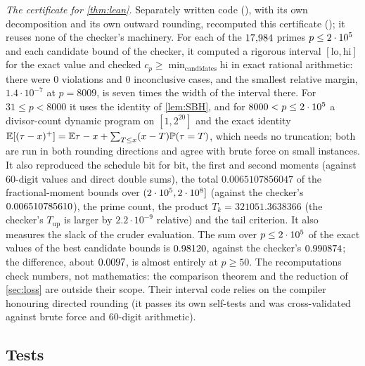 \emph{The certificate for \cref{thm:lean}.} Separately written code (), with its own
decomposition and its own outward rounding, recomputed this certificate (); it reuses none
of the checker's machinery. For each of the $17{,}984$ primes $p\le2\cdot 10^{5}$ and each candidate bound of the checker, it
computed a rigorous interval $[\mathrm{lo},\mathrm{hi}]$ for the exact value and checked
$c_p\ge\min_{\text{candidates}}\mathrm{hi}$ in exact rational arithmetic: there were $0$ violations and $0$
inconclusive cases, and the smallest relative margin, $1.4\cdot10^{-7}$ at $p=8009$, is seven times the width of the
interval there. For $31\le p<8000$ it uses the identity of \cref{lem:SBH}, and for $8000<p\le2\cdot 10^{5}$ a divisor-count
dynamic program on $[1,2^{20}]$ and the exact identity $\mathbb{E}[(\tau-x)^+]=\mathbb{E}\tau-x+\sum_{T\le x}(x-T)\mathbb{P}(\tau=T)$, which
needs no truncation; both are run in both rounding directions and agree with brute force on small instances. It also
reproduced the schedule bit for bit, the first and second moments (against $60$-digit values and direct double sums),
the total $0.0065107856047$ of the fractional-moment bounds over $(2\cdot 10^{5},2\cdot 10^{8}]$ (against the checker's $0.006510785610$), the
prime count, the product $T_k=321051.3638366$ (the checker's $T_{\mathrm{up}}$ is larger by $2.2\cdot10^{-9}$ relative)
and the tail criterion. It also measures the slack of the cruder evaluation. The sum over $p\le2\cdot 10^{5}$ of the exact values of the
best candidate bounds is $0.98120$, against the checker's $0.990874$; the difference, about $0.0097$, is
almost entirely at $p\ge50$. The recomputations check numbers, not mathematics: the comparison theorem and the
reduction of \cref{sec:loss} are outside their scope. Their interval code relies on the compiler honouring directed
rounding (it passes its own self-tests and was cross-validated against brute force and $60$-digit arithmetic).

\subsection{Tests}\label{sec:tests}

